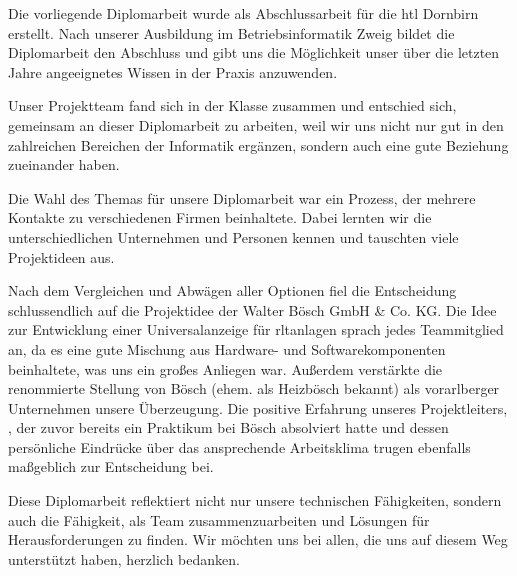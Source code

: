 Die vorliegende Diplomarbeit wurde als Abschlussarbeit für die \ac{htl} Dornbirn erstellt. Nach unserer Ausbildung im Betriebsinformatik Zweig bildet die Diplomarbeit den Abschluss und gibt uns die Möglichkeit unser über die letzten Jahre angeeignetes Wissen in der Praxis anzuwenden.

Unser Projektteam fand sich in der Klasse zusammen und entschied sich, gemeinsam an dieser Diplomarbeit zu arbeiten, weil wir uns nicht nur gut in den zahlreichen Bereichen der Informatik ergänzen, sondern auch eine gute Beziehung zueinander haben.

Die Wahl des Themas für unsere Diplomarbeit war ein Prozess, der mehrere Kontakte zu verschiedenen Firmen beinhaltete. Dabei lernten wir die unterschiedlichen Unternehmen und Personen kennen und tauschten viele Projektideen aus.

Nach dem Vergleichen und Abwägen aller Optionen fiel die Entscheidung schlussendlich auf die Projektidee der Walter Bösch GmbH \& Co. KG. Die Idee zur Entwicklung einer Universalanzeige für \acl{rltanlagen} sprach jedes Teammitglied an, da es eine gute Mischung aus Hardware- und Softwarekomponenten beinhaltete, was uns ein großes Anliegen war. Außerdem verstärkte die renommierte Stellung von Bösch (ehem. als Heizbösch bekannt) als vorarlberger Unternehmen unsere Überzeugung. Die positive Erfahrung unseres Projektleiters, \mangeng, der zuvor bereits ein Praktikum bei Bösch absolviert hatte und dessen persönliche Eindrücke über das ansprechende Arbeitsklima trugen ebenfalls maßgeblich zur Entscheidung bei.

Diese Diplomarbeit reflektiert nicht nur unsere technischen Fähigkeiten, sondern auch die Fähigkeit, als Team zusammenzuarbeiten und Lösungen für Herausforderungen zu finden. Wir möchten uns bei allen, die uns auf diesem Weg unterstützt haben, herzlich bedanken.